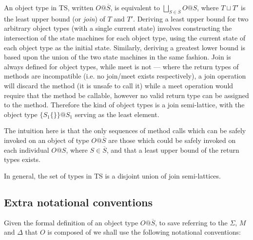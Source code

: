 \documentclass[preprint]{sigplanconf}
\begin{document}



An object type in TS, written $O@\overline{S}$, is equivalent to
$\bigsqcup_{S \in \overline{S}} O@S$, where $T \sqcup T'$ is the least upper
bound (or {\it join}) of $T$ and $T'$. Deriving a least upper bound for
two arbitrary object types (with a single current state) 
involves constructing the intersection of the state machines for each object 
type, using the current state of each object type as the initial state.
Similarly, deriving a greatest lower bound is based upon the union of
the two state machines in the same fashion. Join is always defined for
object types, while meet is not --- where the return types of methods are
incompatible (i.e. no join/meet exists respectively), a join operation will 
discard the method (it is unsafe to
call it) while a meet operation would require that the method be callable,
however no valid return type can be assigned to the method. Therefore
the kind of object types is a join semi-lattice, with the object type 
$\{ S_1 \{\} \}@S_1$ serving as the least element. 

The intuition here is that the only sequences of method calls which can be 
safely invoked on an object of type $O@\overline{S}$ are those which could be 
safely invoked on each individual $O@S$, where $S \in \overline{S}$, and that
a least upper bound of the return types exists.

In general, the set of
types in TS is a disjoint union of join semi-lattices.

\subsection{Extra notational conventions}

Given the formal definition of an object type $O@\overline{S}$, to save
referring to the $\Sigma$, $M$ and $\Delta$ that $O$ is composed of we shall
use the following notational conventions:
\end{document}
